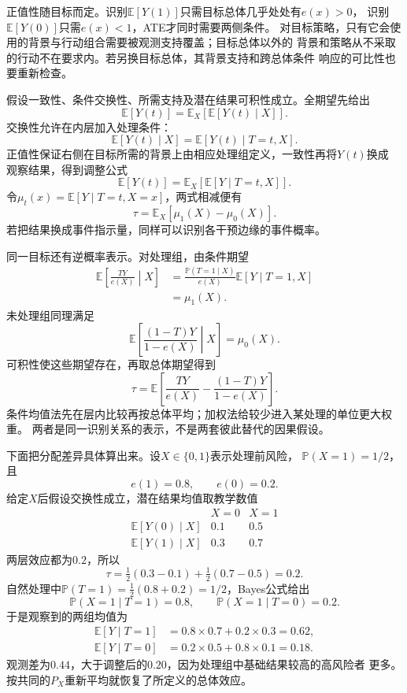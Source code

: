 正值性随目标而定。识别\(\mathbb E[Y(1)]\)只需目标总体几乎处处有\(e(x)>0\)，
识别\(\mathbb E[Y(0)]\)只需\(e(x)<1\)，ATE才同时需要两侧条件。
对目标策略，只有它会使用的背景与行动组合需要被观测支持覆盖；目标总体以外的
背景和策略从不采取的行动不在要求内。若另换目标总体，其背景支持和跨总体条件
响应的可比性也要重新检查。

假设一致性、条件交换性、所需支持及潜在结果可积性成立。全期望先给出
\[
  \mathbb E[Y(t)]
  =\mathbb E_X[\mathbb E[Y(t)\mid X]].
\]
交换性允许在内层加入处理条件：
\[
  \mathbb E[Y(t)\mid X]
  =\mathbb E[Y(t)\mid T=t,X].
\]
正值性保证右侧在目标所需的背景上由相应处理组定义，一致性再将\(Y(t)\)换成
观察结果，得到调整公式
\begin{equation}
  \mathbb E[Y(t)]
  =\mathbb E_X[\mathbb E[Y\mid T=t,X]].
  \label{eq:causal-g-formula}
\end{equation}
令\(\mu_t(x)=\mathbb E[Y\mid T=t,X=x]\)，两式相减便有
\begin{equation}
  \tau=\mathbb E_X[\mu_1(X)-\mu_0(X)].
  \label{eq:causal-ate-adjustment}
\end{equation}
若把结果换成事件指示量，同样可以识别各干预边缘的事件概率。

同一目标还有逆概率表示。对处理组，由条件期望
\[
  \begin{aligned}
    \mathbb E\left[\frac{TY}{e(X)}\middle|X\right]
    &=
    \frac{\mathbb P(T=1\mid X)}{e(X)}
      \mathbb E[Y\mid T=1,X]\\
    &=\mu_1(X).
  \end{aligned}
\]
未处理组同理满足
\[
  \mathbb E\left[\frac{(1-T)Y}{1-e(X)}\middle|X\right]
  =\mu_0(X).
\]
可积性使这些期望存在，再取总体期望得到
\begin{equation}
  \tau=\mathbb E\left[
    \frac{TY}{e(X)}-\frac{(1-T)Y}{1-e(X)}
  \right].
  \label{eq:causal-ipw-identification}
\end{equation}
条件均值法先在层内比较再按总体平均；加权法给较少进入某处理的单位更大权重。
两者是同一识别关系的表示，不是两套彼此替代的因果假设。

下面把分配差异具体算出来。设\(X\in\{0,1\}\)表示处理前风险，
\(\mathbb P(X=1)=1/2\)，且
\[
  e(1)=0.8,\qquad e(0)=0.2.
\]
给定\(X\)后假设交换性成立，潜在结果均值取教学数值
\[
  \begin{array}{c|cc}
    &X=0&X=1\\ \hline
    \mathbb E[Y(0)\mid X]&0.1&0.5\\
    \mathbb E[Y(1)\mid X]&0.3&0.7
  \end{array}
\]
两层效应都为\(0.2\)，所以
\[
  \tau=\tfrac12(0.3-0.1)+\tfrac12(0.7-0.5)=0.2.
\]
自然处理中\(\mathbb P(T=1)=\tfrac12(0.8+0.2)=1/2\)，Bayes公式给出
\[
  \mathbb P(X=1\mid T=1)=0.8,\qquad
  \mathbb P(X=1\mid T=0)=0.2.
\]
于是观察到的两组均值为
\[
  \begin{aligned}
    \mathbb E[Y\mid T=1]&=0.8\times0.7+0.2\times0.3=0.62,\\
    \mathbb E[Y\mid T=0]&=0.2\times0.5+0.8\times0.1=0.18.
  \end{aligned}
\]
观测差为\(0.44\)，大于调整后的\(0.20\)，因为处理组中基础结果较高的高风险者
更多。按共同的\(P_X\)重新平均就恢复了所定义的总体效应。

